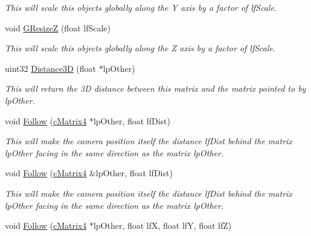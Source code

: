 \begin{DoxyCompactItemize}
\begin{DoxyCompactList}\small\item\em This will scale this objects globally along the Y axis by a factor of lfScale. \end{DoxyCompactList}\item 
\hypertarget{classc_camera_matrix4_a1ab7808cf06ddf7ec373b926c77f85c6}{
void \hyperlink{classc_camera_matrix4_a1ab7808cf06ddf7ec373b926c77f85c6}{GResizeZ} (float lfScale)}
\label{classc_camera_matrix4_a1ab7808cf06ddf7ec373b926c77f85c6}

\begin{DoxyCompactList}\small\item\em This will scale this objects globally along the Z axis by a factor of lfScale. \end{DoxyCompactList}\item 
\hypertarget{classc_camera_matrix4_adf5481b8c761008b9611e0b071e70914}{
uint32 \hyperlink{classc_camera_matrix4_adf5481b8c761008b9611e0b071e70914}{Distance3D} (float $\ast$lpOther)}
\label{classc_camera_matrix4_adf5481b8c761008b9611e0b071e70914}

\begin{DoxyCompactList}\small\item\em This will return the 3D distance between this matrix and the matrix pointed to by lpOther. \end{DoxyCompactList}\item 
\hypertarget{classc_camera_matrix4_aeee787e0f5895a613e8be9efbade408f}{
void \hyperlink{classc_camera_matrix4_aeee787e0f5895a613e8be9efbade408f}{Follow} (\hyperlink{classc_matrix4}{cMatrix4} $\ast$lpOther, float lfDist)}
\label{classc_camera_matrix4_aeee787e0f5895a613e8be9efbade408f}

\begin{DoxyCompactList}\small\item\em This will make the camera position itself the distance lfDist behind the matrix lpOther facing in the same direction as the matrix lpOther. \end{DoxyCompactList}\item 
\hypertarget{classc_camera_matrix4_a0bb6a232830c5e5571677b048cc1c45d}{
void \hyperlink{classc_camera_matrix4_a0bb6a232830c5e5571677b048cc1c45d}{Follow} (\hyperlink{classc_matrix4}{cMatrix4} \&lpOther, float lfDist)}
\label{classc_camera_matrix4_a0bb6a232830c5e5571677b048cc1c45d}

\begin{DoxyCompactList}\small\item\em This will make the camera position itself the distance lfDist behind the matrix lpOther facing in the same direction as the matrix lpOther. \end{DoxyCompactList}\item 
\hypertarget{classc_camera_matrix4_ad511368c294014edf99ebbe9dbf53bc2}{
void \hyperlink{classc_camera_matrix4_ad511368c294014edf99ebbe9dbf53bc2}{Follow} (\hyperlink{classc_matrix4}{cMatrix4} $\ast$lpOther, float lfX, float lfY, float lfZ)}
\label{classc_camera_matrix4_ad511368c294014edf99ebbe9dbf53bc2}


\end{DoxyCompactItemize}
